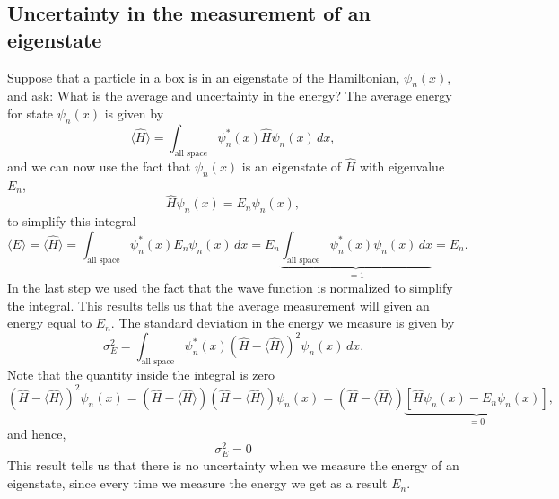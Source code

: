 \documentclass[../Main/chem331-notes.tex]{subfiles}
\begin{document}
\subsection{Uncertainty in the measurement of an eigenstate}
Suppose that a particle in a box is in an eigenstate of the Hamiltonian, $\psi_n(x)$, and ask: What is the average and uncertainty in the energy?
The average energy for state $\psi_n(x)$ is given by
\begin{equation}
\langle \hat{H} \rangle =  \int_\text{all space} \psi_n^*(x) \hat{H} \psi_n(x) \, dx,
\end{equation}
and we can now use the fact that $\psi_n(x)$ is an eigenstate of $\hat{H}$ with eigenvalue $E_n$,
\begin{equation}
\hat{H} \psi_n(x) = E_n \psi_n(x),
\end{equation}
to simplify this integral
\begin{equation}
\langle E \rangle = \langle \hat{H} \rangle =  \int_\text{all space} \psi_n^*(x) E_n \psi_n(x) \, dx 
=  E_n \underbrace{\int_\text{all space} \psi_n^*(x) \psi_n(x) \, dx}_{= 1} = E_n.
\end{equation}
In the last step we used the fact that the wave function is normalized to simplify the integral.
This results tells us that the average measurement will given an energy equal to $E_n$.
The standard deviation in the energy we measure is given by
\begin{equation}
\sigma^2_E
= \int_\text{all space} \psi_n^*(x) (\hat{H} - \langle \hat{H} \rangle)^2 \psi_n(x) \, dx.
\end{equation}
Note that the quantity inside the integral is zero
\begin{equation}
(\hat{H} - \langle \hat{H} \rangle)^2 \psi_n(x) = (\hat{H} - \langle \hat{H} \rangle) (\hat{H} - \langle \hat{H} \rangle)\psi_n(x) = (\hat{H} - \langle \hat{H} \rangle) \underbrace{\left[\hat{H} \psi_n(x) - E_n \psi_n(x)\right]}_{= 0},
\end{equation}
and hence, 
\begin{equation}
\sigma^2_E = 0
\end{equation}
This result tells us that there is no uncertainty when we measure the energy of an eigenstate, since every time we measure the energy we get as a result $E_n$.
\end{document}
